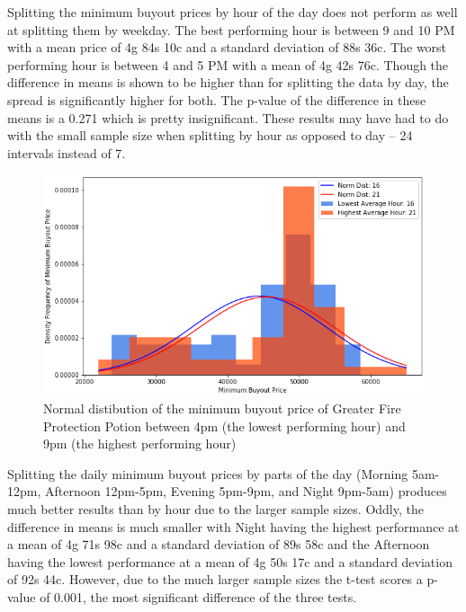 \documentclass[sigconf]{acmart}
\begin{document}
Splitting the minimum buyout prices by hour of the day does not perform as well at splitting them by weekday. The best performing hour is between 9 and 10 PM with a mean price of 4g 84s 10c and a standard deviation of 88s 36c. The worst performing hour is between 4 and 5 PM with a mean of 4g 42s 76c. Though the difference in means is shown to be higher than for splitting the data by day, the spread is significantly higher for both. The p-value of the difference in these means is a 0.271 which is pretty insignificant. These results may have had to do with the small sample size when splitting by hour as opposed to day – 24 intervals instead of 7.

\begin{figure}[h]
\centering
\includegraphics[width=\linewidth]{hourly_hist}
\caption{Normal distibution of the minimum buyout price of Greater Fire Protection Potion between 4pm (the lowest performing hour) and 9pm (the highest performing hour)}
\end{figure}

Splitting the daily minimum buyout prices by parts of the day (Morning 5am-12pm, Afternoon 12pm-5pm, Evening 5pm-9pm, and Night 9pm-5am) produces much better results than by hour due to the larger sample sizes. Oddly, the difference in means is much smaller with Night having the highest performance at a mean of 4g 71s 98c and a standard deviation of 89s 58c and the Afternoon having the lowest performance at a mean of 4g 50s 17c and a standard deviation of 92s 44c. However, due to the much larger sample sizes the t-test scores a p-value of 0.001, the most significant difference of the three tests.
\end{document}
